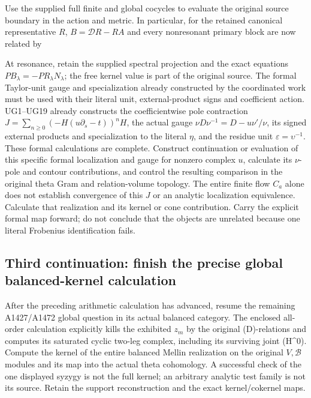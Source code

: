 Use the supplied full finite and global cocycles to evaluate the
original source boundary in the action and metric. In particular, for
the retained canonical representative \(R\), \(B=\mathscr D R-RA\) and
every nonresonant primary block are now related by


At resonance, retain the supplied spectral projection and the exact
equations \(PB_\lambda=-PR_\lambda N_\lambda\); the free kernel value is
part of the original source. The formal Taylor-unit gauge and
specialization already constructed by the coordinated work must be used
with their literal unit, external-product signs and coefficient action.
UG1--UG19 already constructs the coefficientwise pole contraction
\(J=\sum_{n\ge0}(-H(u\partial_s-t))^nH\), the actual gauge
\(\nu D\nu^{-1}=D-u\nu'/\nu\), its signed external products and
specialization to the literal \(\eta\), and the residue unit
\(\varepsilon=\upsilon^{-1}\). These formal calculations are complete.
Construct continuation or evaluation of this specific formal
localization and gauge for nonzero complex \(u\), calculate its
\(\nu\)-pole and contour contributions, and control the resulting
comparison in the original theta Gram and relation-volume topology. The
entire finite flow \(C_a\) alone does not establish convergence of this
\(J\) or an analytic localization equivalence. Calculate that
realization and its kernel or cone contribution. Carry the explicit
formal map forward; do not conclude that the objects are unrelated
because one literal Frobenius identification fails.

\subsection{Third continuation: finish the precise global
balanced-kernel
calculation}\label{TranscriptLedgerStage:third-continuation-finish-the-precise-global-balanced-kernel-calculation}

After the preceding arithmetic calculation has advanced, resume the
remaining A1427/A1472 global question in its actual balanced category.
The enclosed all-order calculation explicitly kills the exhibited
\(z_m\) by the original (D)-relations and computes its saturated cyclic
two-leg complex, including its surviving joint (H\^{}0). Compute the
kernel of the entire balanced Mellin realization on the original
\(V,\mathscr B\) modules and its map into the actual theta cohomology. A
successful check of the one displayed syzygy is not the full kernel; an
arbitrary analytic test family is not its source. Retain the support
reconstruction and the exact kernel/cokernel maps.

